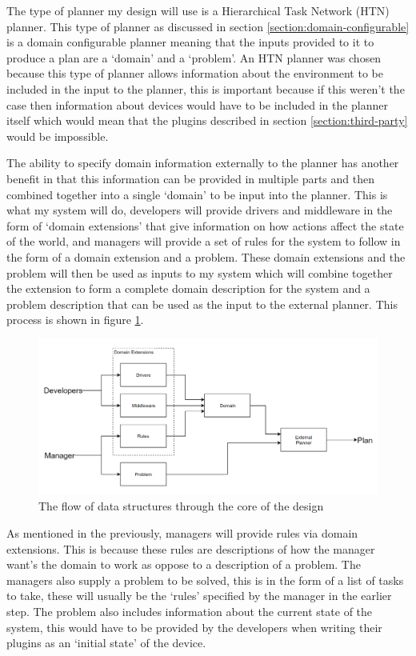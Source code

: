 The type of planner my design will use is a Hierarchical Task Network (HTN)
planner. This type of planner as discussed in section
\ref{section:domain-configurable} is a domain configurable planner meaning that
the inputs provided to it to produce a plan are a `domain' and a `problem'. An
HTN planner was chosen because this type of planner allows information about the
environment to be included in the input to the planner, this is important
because if this weren't the case then information about devices would have to be
included in the planner itself which would mean that the plugins described in
section \ref{section:third-party} would be impossible.

The ability to specify domain information externally to the planner has another
benefit in that this information can be provided in multiple parts and then
combined together into a single `domain' to be input into the planner. This is
what my system will do, developers will provide drivers and middleware in the
form of `domain extensions' that give information on how actions affect the
state of the world, and managers will provide a set of rules for the system to
follow in the form of a domain extension and a problem. These domain extensions
and the problem will then be used as inputs to my system which will combine
together the extension to form a complete domain description for the system and
a problem description that can be used as the input to the external planner.
This process is shown in figure \ref{fig:domain-diagram}.

\begin{figure}
  \centering
  \includegraphics[width=1\linewidth]{figures/domain-diagram.png}
  \caption{The flow of data structures through the core of the design}
  \label{fig:domain-diagram}
\end{figure}

As mentioned in the previously, managers will provide rules via domain
extensions. This is because these rules are descriptions of how the manager
want's the domain to work as oppose to a description of a problem. The managers
also supply a problem to be solved, this is in the form of a list of tasks to
take, these will usually be the `rules' specified by the manager in the earlier
step. The problem also includes information about the current state of the
system, this would have to be provided by the developers when writing their
plugins as an `initial state' of the device.

